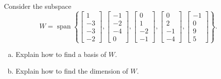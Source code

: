 
\begin{exerciseStatement}


Consider the subspace \[W=\operatorname{span}  \left\{ \left[\begin{array}{c}
1 \\
-3 \\
-3 \\
-2
\end{array}\right] , \left[\begin{array}{c}
-1 \\
-2 \\
-4 \\
0
\end{array}\right] , \left[\begin{array}{c}
0 \\
1 \\
-2 \\
-1
\end{array}\right] , \left[\begin{array}{c}
0 \\
2 \\
-1 \\
-4
\end{array}\right] , \left[\begin{array}{c}
-1 \\
0 \\
9 \\
5
\end{array}\right] \right\} .\]


\begin{enumerate}[(a)]
\item  Explain how to find a basis of \(W\).
\item  Explain how to find the dimension of \(W\).
\end{enumerate}
    
\end{exerciseStatement}
    
